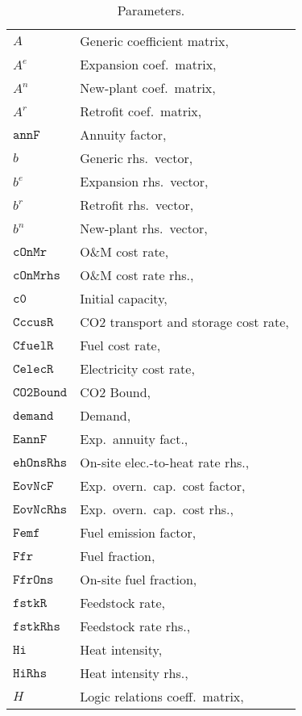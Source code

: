 \documentclass{amsbook}
\begin{document}
\begin{longtable}[c]{@{}ll@{}}
    \caption{Parameters.}\label{tab:params} \\
    $A$ & Generic coefficient matrix,\\
    $A^e$	& Expansion coef.\ matrix, \\
    $A^n$	& New-plant coef.\ matrix, \\
    $A^r$	& Retrofit coef.\ matrix, \\
    $\mathtt{annF}$	& Annuity factor, \\
    $b$ & Generic rhs.\ vector,\\
    $b^e$	& Expansion rhs.\ vector, \\
    $b^r$	& Retrofit rhs.\ vector, \\
    $b^n$	& New-plant rhs.\ vector, \\
    $\mathtt{cOnMr}$	& O\&M cost rate, \\
    $\mathtt{cOnMrhs}$	& O\&M cost rate rhs., \\
    $\mathtt{c0}$	& Initial capacity, \\
    $\mathtt{CccusR}$ & CO2 transport and storage cost rate, \\
    $\mathtt{CfuelR}$ & Fuel cost rate, \\
    $\mathtt{CelecR}$ & Electricity cost rate, \\
    $\mathtt{CO2Bound}$ & CO2 Bound, \\
    $\mathtt{demand}$ & Demand, \\
    $\mathtt{EannF}$	& Exp.\ annuity fact., \\
    $\mathtt{ehOnsRhs}$	& On-site elec.-to-heat rate rhs., \\
    $\mathtt{EovNcF}$	& Exp.\ overn.\ cap.\ cost factor, \\
    $\mathtt{EovNcRhs}$	& Exp.\ overn.\ cap.\ cost rhs., \\
    $\mathtt{Femf}$	& Fuel emission factor, \\
    $\mathtt{Ffr}$	& Fuel fraction, \\
    $\mathtt{FfrOns}$	& On-site fuel fraction, \\
    $\mathtt{fstkR}$	& Feedstock rate, \\
    $\mathtt{fstkRhs}$	& Feedstock rate rhs., \\
    $\mathtt{Hi}$	& Heat intensity, \\
    $\mathtt{HiRhs}$	& Heat intensity rhs., \\
    $H$ & Logic relations coeff.\ matrix,\\

\end{longtable}
\end{document}
